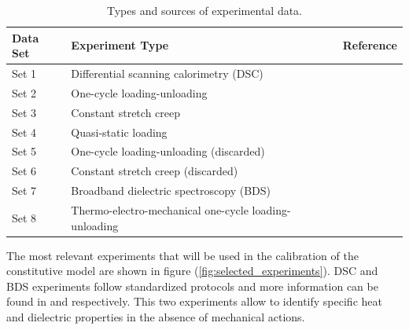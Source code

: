 \begin{table}[htb]
\centering
\caption{Types and sources of experimental data.}
\label{tab:experiment_sources}
\begin{tabular}{@{}llc@{}}
\toprule
Data Set & Experiment Type & Reference \\
\midrule
Set 1 & Differential scanning calorimetry (DSC)            & \cite{Dippel2015} \\
Set 2 & One-cycle loading-unloading                        & \cite{Liao_Mokarram2020} \\
Set 3 & Constant stretch creep                             & \cite{Liao_Mokarram2020} \\
Set 4 & Quasi-static loading                               & \cite{Liao_Mokarram2020} \\
Set 5 & One-cycle loading-unloading (discarded)            & \cite{Alkhoury2022} \\
Set 6 & Constant stretch creep (discarded)                 & \cite{Alkhoury2022} \\
Set 7 & Broadband dielectric spectroscopy (BDS)            & \cite{Sheng2012} \\
Set 8 & Thermo-electro-mechanical one-cycle loading-unloading & \cite{Mehnert2021a} \\
\bottomrule
\end{tabular}
\end{table}


The most relevant experiments that will be used in the calibration of the constitutive model are shown in figure (\ref{fig:selected_experiments}). DSC and BDS experiments follow standardized protocols and more information can be found in \cite{Hohne2003_DSC} and \cite{Kremer2003_BDS} respectively. This two experiments allow to identify specific heat and dielectric properties in the absence of mechanical actions.


